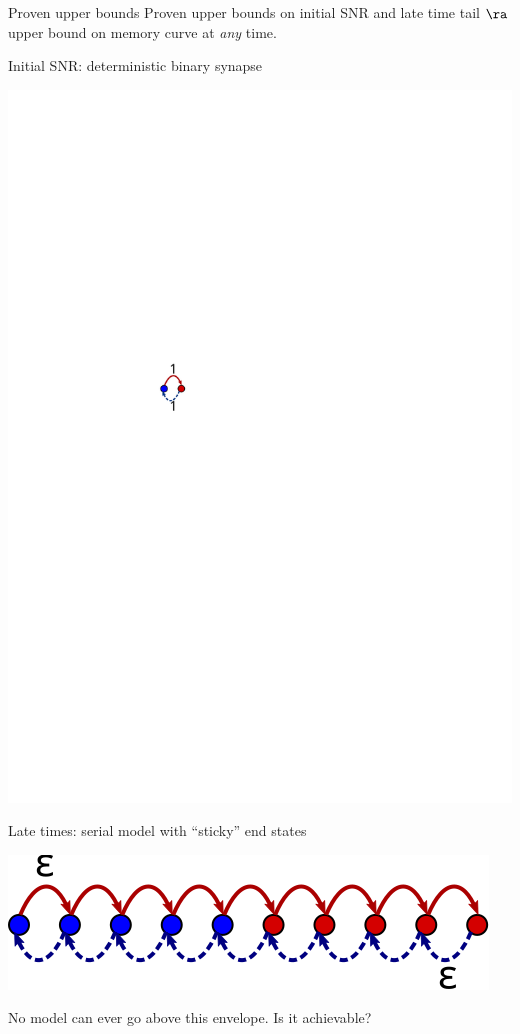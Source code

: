 \documentclass[final,hyperref={pdfpagelabels=false,bookmarks=false}]{beamer}
\begin{document}
\begin{frame}{}
\begin{columns}[t]
\begin{column}{0.33\linewidth}

\begin{block}{Proven upper bounds}
%
 Proven upper bounds on initial SNR and late time tail
 $\ra$ upper bound on memory curve at \emph{any} time.

\vp
\parbox[c]{0.45\linewidth}{
 \begin{center}
 \end{center}
}
\hspace{0.5cm}
\parbox[c]{0.45\linewidth}{
   Initial SNR: deterministic binary synapse
   \begin{center}
     \includegraphics[height=0.1\linewidth]{binary_det.svg}
   \end{center}

   \vp Late times: serial model with ``sticky'' end states
   \begin{center}
     \includegraphics[height=0.1\linewidth]{multistate_sticky.svg}
   \end{center}
}

 
 \vp No model can ever go above this envelope. 
 Is it achievable?
%
\end{block}



\end{column}
\end{columns}
\end{frame}
\end{document}
